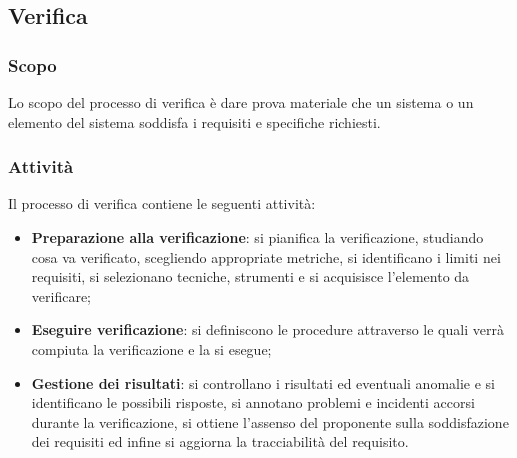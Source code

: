 	
	\subsection{Verifica}
	\subsubsection{Scopo}
	Lo scopo del processo di verifica è dare prova materiale che un sistema o un elemento del sistema soddisfa i requisiti e specifiche richiesti.
	\subsubsection{Attività}
	Il processo di verifica contiene le seguenti attività:
	\begin{itemize}
	    \item \textbf{Preparazione alla verificazione}: si pianifica la verificazione, studiando cosa va verificato, scegliendo appropriate metriche, si identificano i limiti nei requisiti, si selezionano tecniche, strumenti e si acquisisce l'elemento da verificare;
	    \item \textbf{Eseguire verificazione}: si definiscono le procedure attraverso le quali verrà compiuta la verificazione e la si esegue;
	    \item \textbf{Gestione dei risultati}: si controllano i risultati ed eventuali anomalie e si identificano le possibili risposte, si annotano problemi e incidenti accorsi durante la verificazione, si ottiene l'assenso del proponente sulla soddisfazione dei requisiti ed infine si aggiorna la tracciabilità del requisito.
	\end{itemize}
